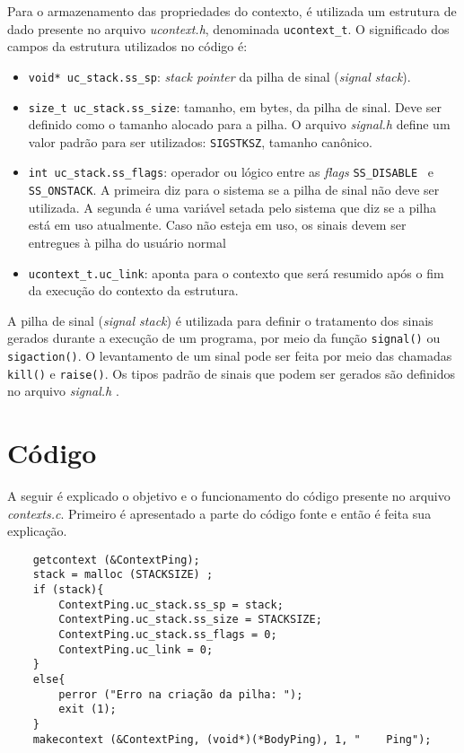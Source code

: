 \documentclass [12pt,oneside] {article}
\begin{document}
Para o armazenamento das propriedades do contexto, é utilizada um estrutura de dado presente no arquivo \emph{ucontext.h}, denominada \texttt{ucontext\_t}. O significado dos campos da estrutura utilizados no código é:

\begin{itemize}
	\item \texttt{void* uc\_stack.ss\_sp}: \emph{stack pointer} da pilha de sinal (\emph{signal stack}).
	\item \texttt{size\_t uc\_stack.ss\_size}: tamanho, em bytes, da pilha de sinal. Deve ser definido como o tamanho alocado para a pilha. O arquivo \emph{signal.h} define um valor padrão para ser utilizados: \texttt{SIGSTKSZ}, tamanho canônico.
	\item \texttt{int uc\_stack.ss\_flags}: operador ou lógico entre as \emph{flags} \texttt{SS\_DISABLE } e\\ \texttt{SS\_ONSTACK}. A primeira diz para o sistema se a pilha de sinal não deve ser utilizada. A segunda é uma variável setada pelo sistema que diz se a pilha está em uso atualmente. Caso não esteja em uso, os sinais devem ser entregues à pilha do usuário normal 
	\item \texttt{ucontext\_t.uc\_link}: aponta para o contexto que será resumido após o fim da execução do contexto da estrutura.
\end{itemize}

A pilha de sinal (\emph{signal stack}) é utilizada para definir o tratamento dos sinais gerados durante a execução de um programa, por meio da função \texttt{signal()} ou \texttt{sigaction()}. O levantamento de um sinal pode ser feita por meio das chamadas \texttt{kill()} e \texttt{raise()}. Os tipos padrão de sinais que podem ser gerados são definidos no arquivo \emph{signal.h} \cite{ManualGNU2019}.

\section{Código}

A seguir é explicado o objetivo e o funcionamento do código presente no arquivo \emph{contexts.c}. Primeiro é apresentado a parte do código fonte e então é feita sua explicação.

\begin{footnotesize}
	\begin{verbatim}
	getcontext (&ContextPing);
	stack = malloc (STACKSIZE) ;
	if (stack){
	    ContextPing.uc_stack.ss_sp = stack;
	    ContextPing.uc_stack.ss_size = STACKSIZE;
	    ContextPing.uc_stack.ss_flags = 0; 
	    ContextPing.uc_link = 0;
	}
	else{
	    perror ("Erro na criação da pilha: ");
	    exit (1);
	}
	makecontext (&ContextPing, (void*)(*BodyPing), 1, "    Ping");
	\end{verbatim}
\end{footnotesize}
\end{document}
